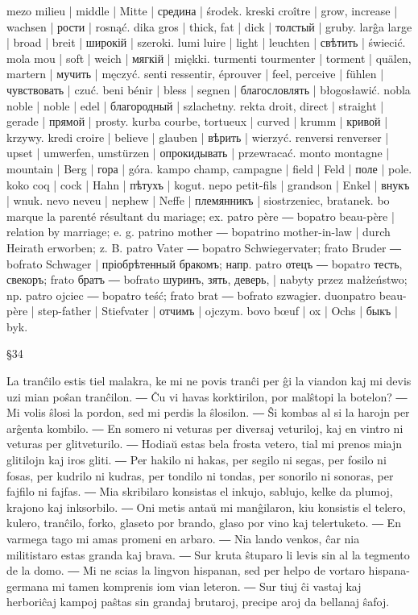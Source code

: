mezo milieu | middle | Mitte | средина | środek.
kreski croître | grow, increase | wachsen | рости | rosnąć.
dika gros | thick, fat | dick | толстый | gruby.
larĝa large | broad | breit | широкій | szeroki.
lumi luire | light | leuchten | свѣтить | świecić.
mola mou | soft | weich | мягкій | miękki.
turmenti tourmenter | torment | quälen, martern | мучить | męczyć.
senti ressentir, éprouver | feel, perceive | fühlen | чувствовать | czuć.
beni bénir | bless | segnen | благословлять | błogosławić.
nobla noble | noble | edel | благородный | szlachetny.
rekta droit, direct | straight | gerade | прямой | prosty.
kurba courbe, tortueux | curved | krumm | кривой | krzywy.
kredi croire | believe | glauben | вѣрить | wierzyć.
renversi renverser | upset | umwerfen, umstürzen | опрокидывать | przewracać.
monto montagne | mountain | Berg | гора | góra.
kampo champ, campagne | field | Feld | поле | pole.
koko coq | cock | Hahn | пѣтухъ | kogut.
nepo petit-fils | grandson | Enkel | внукъ | wnuk.
nevo neveu | nephew | Neffe | племянникъ | siostrzeniec, bratanek.
bo marque la parenté résultant du mariage; ex. patro père ― bopatro beau-père | relation by marriage; e. g. patrino mother ― bopatrino mother-in-law | durch Heirath erworben; z. B. patro Vater ― bopatro Schwiegervater; frato Bruder ― bofrato Schwager | пріобрѣтенный бракомъ; напр. patro отецъ ― bopatro тесть, свекоръ; frato братъ ― bofrato шуринъ, зять, деверь, | nabyty przez małżeństwo; np. patro ojciec ― bopatro teść; frato brat ― bofrato szwagier.
duonpatro beau-père | step-father | Stiefvater | отчимъ | ojczym.
bovo bœuf | ox | Ochs | быкъ | byk.

§34

La tranĉilo estis tiel malakra, ke mi ne povis tranĉi per ĝi la viandon kaj mi devis uzi mian poŝan tranĉilon. ― Ĉu vi havas korktirilon, por malŝtopi la botelon? ― Mi volis ŝlosi la pordon, sed mi perdis la ŝlosilon. ― Ŝi kombas al si la harojn per arĝenta kombilo. ― En somero ni veturas per diversaj veturiloj, kaj en vintro ni veturas per glitveturilo. ― Hodiaŭ estas bela frosta vetero, tial mi prenos miajn glitilojn kaj iros gliti. ― Per hakilo ni hakas, per segilo ni segas, per fosilo ni fosas, per kudrilo ni kudras, per tondilo ni tondas, per sonorilo ni sonoras, per fajfilo ni fajfas. ― Mia skribilaro konsistas el inkujo, sablujo, kelke da plumoj, krajono kaj inksorbilo. ― Oni metis antaŭ mi manĝilaron, kiu konsistis el telero, kulero, tranĉilo, forko, glaseto por brando, glaso por vino kaj telertuketo. ― En varmega tago mi amas promeni en arbaro. ― Nia lando venkos, ĉar nia militistaro estas granda kaj brava. ― Sur kruta ŝtuparo li levis sin al la tegmento de la domo. ― Mi ne scias la lingvon hispanan, sed per helpo de vortaro hispana-germana mi tamen komprenis iom vian leteron. ― Sur tiuj ĉi vastaj kaj herboriĉaj kampoj paŝtas sin grandaj brutaroj, precipe aroj da bellanaj ŝafoj.

